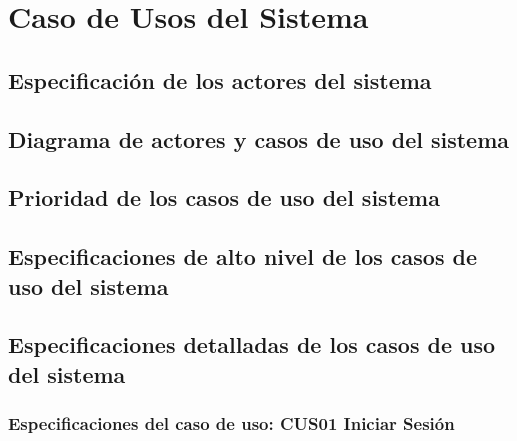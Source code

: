 \chapter{Caso de Usos del Sistema}

\section{Especificación de los actores del sistema}

\section{Diagrama de actores y casos de uso del sistema}

\section{Prioridad de los casos de uso del sistema}

\section{Especificaciones de alto nivel de los casos de uso del sistema}

\section{Especificaciones detalladas de los casos de uso del sistema}

\subsection{Especificaciones del caso de uso: CUS01 Iniciar Sesión}
